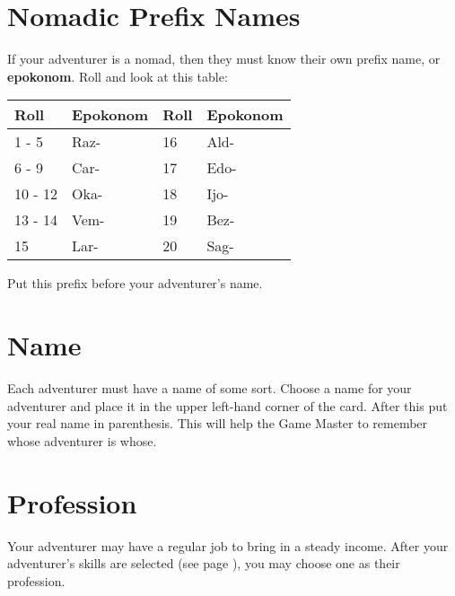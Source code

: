 \begin{multicols*}{2}
\section{Nomadic Prefix Names}
If your adventurer is a nomad, then they must know their own prefix name, or \textbf{epokonom}. Roll  and look at this table:
\begin{tcolorbox}[breakable,boxrule=0pt,title=\textbf{Nomad Prefix Names}]
\begin{tabular}{l l|l l}
Roll & Epokonom & Roll & Epokonom\\
\midrule
1 - 5 & Raz- & 16 & Ald-\\
6 - 9 & Car- & 17 & Edo-\\
10 - 12 & Oka- & 18 & Ijo-\\
13 - 14 & Vem- & 19 & Bez-\\
15 & Lar- & 20 & Sag-\\
\end{tabular}
\end{tcolorbox}
Put this prefix before your adventurer's name.
\section{Name}
Each adventurer must have a name of some sort. Choose a name for your adventurer and place it in the upper left-hand corner of the card. After this put your real name in parenthesis. This will help the Game Master to remember whose adventurer is whose.
\section{Profession}
Your adventurer may have a regular job to bring in a steady income. After your adventurer's skills are selected (see page \textbf{\pageref{create-skills}}), you may choose one as their profession.

\end{multicols*}
